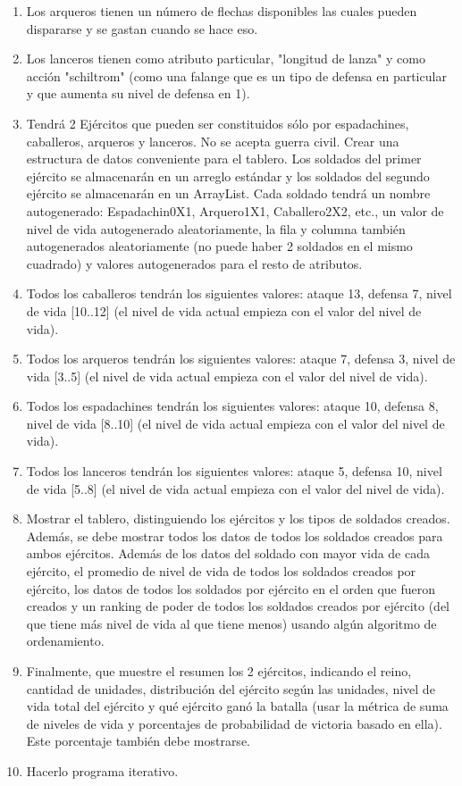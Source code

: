 \begin{enumerate}
    \item Los arqueros tienen un número de flechas disponibles las cuales pueden dispararse y se gastan cuando se hace eso.
    \item Los lanceros tienen como atributo particular, "longitud de lanza" y como acción "schiltrom" (como una falange que es un tipo de defensa en particular y que aumenta su nivel de defensa en 1).
    \item Tendrá 2 Ejércitos que pueden ser constituidos sólo por espadachines, caballeros, arqueros y lanceros. No se acepta guerra civil. Crear una estructura de datos conveniente para el tablero. Los soldados del primer ejército se almacenarán en un arreglo estándar y los soldados del segundo ejército se almacenarán en un ArrayList. Cada soldado tendrá un nombre autogenerado: Espadachin0X1, Arquero1X1, Caballero2X2, etc., un valor de nivel de vida autogenerado aleatoriamente, la fila y columna también autogenerados aleatoriamente (no puede haber 2 soldados en el mismo cuadrado) y valores autogenerados para el resto de atributos.
    \item Todos los caballeros tendrán los siguientes valores: ataque 13, defensa 7, nivel de vida [10..12] (el nivel de vida actual empieza con el valor del nivel de vida).
    \item Todos los arqueros tendrán los siguientes valores: ataque 7, defensa 3, nivel de vida [3..5] (el nivel de vida actual empieza con el valor del nivel de vida).
    \item Todos los espadachines tendrán los siguientes valores: ataque 10, defensa 8, nivel de vida [8..10] (el nivel de vida actual empieza con el valor del nivel de vida).
    \item Todos los lanceros tendrán los siguientes valores: ataque 5, defensa 10, nivel de vida [5..8] (el nivel de vida actual empieza con el valor del nivel de vida).
    \item Mostrar el tablero, distinguiendo los ejércitos y los tipos de soldados creados. Además, se debe mostrar todos los datos de todos los soldados creados para ambos ejércitos. Además de los datos del soldado con mayor vida de cada ejército, el promedio de nivel de vida de todos los soldados creados por ejército, los datos de todos los soldados por ejército en el orden que fueron creados y un ranking de poder de todos los soldados creados por ejército (del que tiene más nivel de vida al que tiene menos) usando algún algoritmo de ordenamiento.
    \item Finalmente, que muestre el resumen los 2 ejércitos, indicando el reino, cantidad de unidades, distribución del ejército según las unidades, nivel de vida total del ejército y qué ejército ganó la batalla (usar la métrica de suma de niveles de vida y porcentajes de probabilidad de victoria basado en ella). Este porcentaje también debe mostrarse.
    \item Hacerlo programa iterativo.
\end{enumerate}
		
